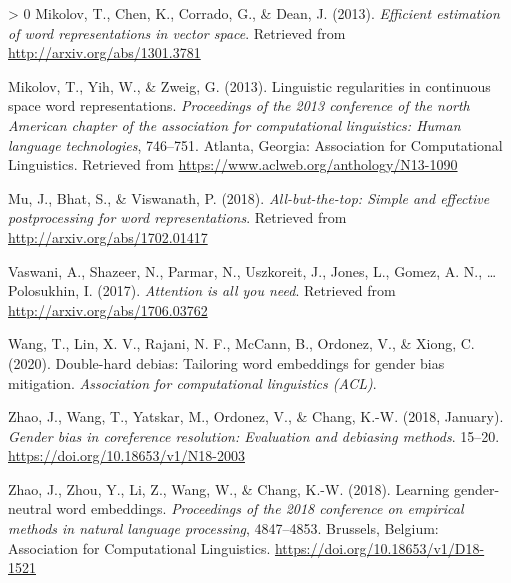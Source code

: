 \documentclass[
  english,
  man,floatsintext]{apa6}
\newlength{\cslhangindent}
\newenvironment{CSLReferences}[3] %
 {%
  \setlength{\parindent}{0pt}
  \ifodd #1 \everypar{\setlength{\hangindent}{\cslhangindent}}\ignorespaces\fi
  \ifnum #2 > 0
  \setlength{\parskip}{#3\baselineskip}
  \fi
 }%
 {}
\begin{document}
\begin{CSLReferences}{1}{0}
\leavevmode\hypertarget{ref-mikolov2013Google}{}%
Mikolov, T., Chen, K., Corrado, G., \& Dean, J. (2013). \emph{Efficient estimation of word representations in vector space}. Retrieved from \url{http://arxiv.org/abs/1301.3781}

\leavevmode\hypertarget{ref-mikolov2013MSR}{}%
Mikolov, T., Yih, W., \& Zweig, G. (2013). Linguistic regularities in continuous space word representations. \emph{Proceedings of the 2013 conference of the north {A}merican chapter of the association for computational linguistics: Human language technologies}, 746--751. Atlanta, Georgia: Association for Computational Linguistics. Retrieved from \url{https://www.aclweb.org/anthology/N13-1090}

\leavevmode\hypertarget{ref-mu_2018}{}%
Mu, J., Bhat, S., \& Viswanath, P. (2018). \emph{All-but-the-top: Simple and effective postprocessing for word representations}. Retrieved from \url{http://arxiv.org/abs/1702.01417}

\leavevmode\hypertarget{ref-vaswani_2017}{}%
Vaswani, A., Shazeer, N., Parmar, N., Uszkoreit, J., Jones, L., Gomez, A. N., \ldots{} Polosukhin, I. (2017). \emph{Attention is all you need}. Retrieved from \url{http://arxiv.org/abs/1706.03762}

\leavevmode\hypertarget{ref-wang_2020}{}%
Wang, T., Lin, X. V., Rajani, N. F., McCann, B., Ordonez, V., \& Xiong, C. (2020). Double-hard debias: Tailoring word embeddings for gender bias mitigation. \emph{Association for computational linguistics (ACL)}.

\leavevmode\hypertarget{ref-zhao_2018a}{}%
Zhao, J., Wang, T., Yatskar, M., Ordonez, V., \& Chang, K.-W. (2018, January). \emph{Gender bias in coreference resolution: Evaluation and debiasing methods}. 15--20. \url{https://doi.org/10.18653/v1/N18-2003}

\leavevmode\hypertarget{ref-zhao_2018b}{}%
Zhao, J., Zhou, Y., Li, Z., Wang, W., \& Chang, K.-W. (2018). Learning gender-neutral word embeddings. \emph{Proceedings of the 2018 conference on empirical methods in natural language processing}, 4847--4853. Brussels, Belgium: Association for Computational Linguistics. \url{https://doi.org/10.18653/v1/D18-1521}

\end{CSLReferences}

\endgroup
\end{document}
